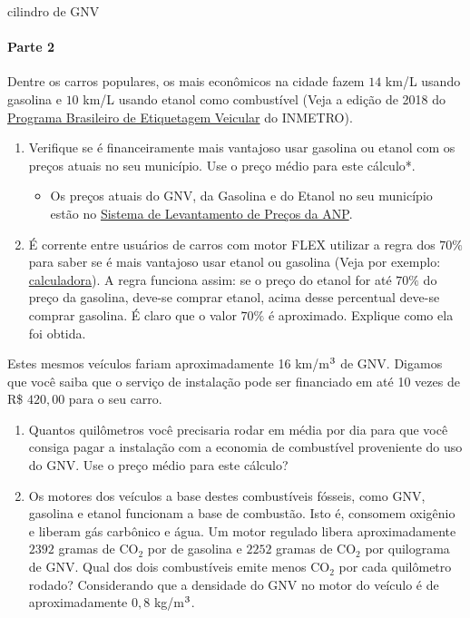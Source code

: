 \begin{task}{cilindro de GNV}
\paragraph{Parte 2}

Dentre os carros populares, os mais econômicos na cidade fazem \(14\) km/L usando gasolina e \(10\) km/L usando etanol como combustível (Veja a edição de 2018 do \href{http://www.inmetro.gov.br/consumidor/pbe/veiculos\_leves\_2018.pdf}{Programa Brasileiro de Etiquetagem Veicular} do INMETRO).
\begin{enumerate}
\item {} 
Verifique se é financeiramente mais vantajoso usar gasolina ou etanol com os preços atuais no seu município. Use o preço médio para este cálculo*.
\begin{itemize}
\item {} 
Os preços atuais do GNV, da Gasolina e do Etanol no seu município estão no \href{http://anp.gov.br/preco/prc/Resumo\_Por\_Municipio\_Index.asp}{Sistema de Levantamento de Preços da ANP}.

\end{itemize}

\item {} 
É corrente entre usuários de carros com motor FLEX utilizar a regra dos $70\%$ para saber se é mais vantajoso usar etanol ou gasolina (Veja por exemplo: \href{http://www.calculoexato.net/calculadora-flex-gasolina-x-alcool/}{calculadora}). A regra funciona assim: se o preço do etanol for até $70\%$ do preço da gasolina, deve-se comprar etanol, acima desse percentual deve-se comprar gasolina. É claro que o valor $70\%$ é aproximado. Explique como ela foi obtida.

\end{enumerate}

Estes mesmos veículos fariam aproximadamente 16 km/m\(\sp{\text{3}}\) de GNV. Digamos que você saiba que o serviço de instalação pode ser financiado em até 10 vezes de R\$ $420{,}00$ para o seu carro.
\begin{enumerate}
\item {} 
Quantos quilômetros você precisaria rodar em média por dia para que você consiga pagar a instalação com a economia de combustível proveniente do uso do GNV. Use o preço médio para este cálculo?

\item {} 
Os motores dos veículos a base destes combustíveis fósseis, como GNV, gasolina e etanol funcionam a base de combustão. Isto é, consomem oxigênio e liberam gás carbônico e água. Um motor regulado libera aproximadamente $2392$ gramas de CO$_2$ por de gasolina e $2252$ gramas de CO$_2$ por quilograma de GNV. Qual dos dois combustíveis emite menos CO$_2$ por cada quilômetro rodado? Considerando que a densidade do GNV no motor do veículo é de aproximadamente $0{,}8$ kg/m\(\sp{\text{3}}\).

\end{enumerate}
\end{task}

